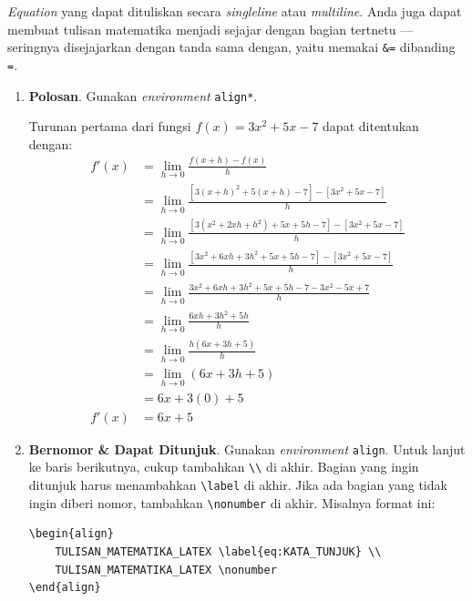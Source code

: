 \textit{Equation} yang dapat dituliskan secara \textit{singleline} atau \textit{multiline}. Anda juga dapat membuat tulisan matematika menjadi sejajar dengan bagian tertnetu --- seringnya disejajarkan dengan tanda sama dengan, yaitu memakai \verb|&=| dibanding \texttt{=}.

\begin{enumerate}[label=\arabic*)]
    \item \textbf{Polosan}. Gunakan \textit{environment} \texttt{align*}.
    
    Turunan pertama dari fungsi $f(x) = 3x^2 + 5x − 7$ dapat ditentukan dengan:
    \begin{align*}
        f'(x) &= \lim_{h \to 0} \frac{f(x+h) - f(x)}{h} \\
        &= \lim_{h \to 0} \frac{[3(x+h)^2 + 5(x+h) - 7] - [3x^2 + 5x - 7]}{h} \\
        &= \lim_{h \to 0} \frac{[3(x^2 + 2xh + h^2) + 5x + 5h - 7] - [3x^2 + 5x - 7]}{h} \\
        &= \lim_{h \to 0} \frac{[3x^2 + 6xh + 3h^2 + 5x + 5h - 7] - [3x^2 + 5x - 7]}{h} \\
        &= \lim_{h \to 0} \frac{3x^2 + 6xh + 3h^2 + 5x + 5h - 7 - 3x^2 - 5x + 7}{h} \\
        &= \lim_{h \to 0} \frac{6xh + 3h^2 + 5h}{h} \\
        &= \lim_{h \to 0} \frac{h(6x + 3h + 5)}{h} \\
        &= \lim_{h \to 0} (6x + 3h + 5) \\
        &= 6x + 3(0) + 5 \\
        f'(x) &= 6x + 5
    \end{align*}
    
    \item \textbf{Bernomor \& Dapat Ditunjuk}. Gunakan \textit{environment} \texttt{align}. Untuk lanjut ke baris berikutnya, cukup tambahkan \verb|\\| di akhir. Bagian yang ingin ditunjuk harus menambahkan \verb|\label| di akhir. Jika ada bagian yang tidak ingin diberi nomor, tambahkan \verb|\nonumber| di akhir. Misalnya format ini:
    
    \begin{lstlisting}
\begin{align}
    TULISAN_MATEMATIKA_LATEX \label{eq:KATA_TUNJUK} \\
    TULISAN_MATEMATIKA_LATEX \nonumber 
\end{align}    
    \end{lstlisting}
    

\end{enumerate}
